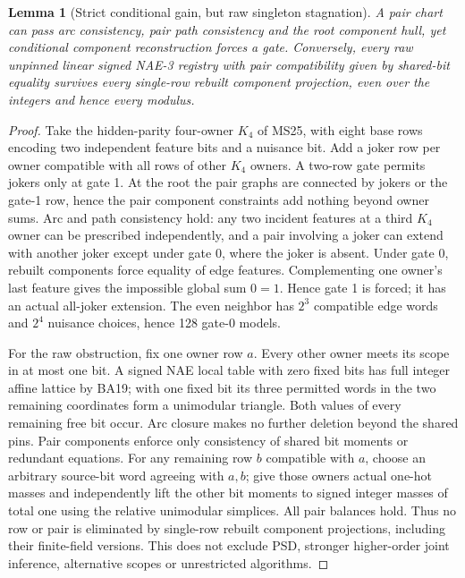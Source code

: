 \documentclass[11pt]{article}
\newtheorem{lemma}[theorem]{Lemma}
\begin{document}
\begin{lemma}[Strict conditional gain, but raw singleton stagnation]\label{lem:ms26-stall}
A pair chart can pass arc consistency, pair path consistency and the root component hull, yet conditional component reconstruction forces a gate. Conversely, every raw unpinned linear signed NAE-3 registry with pair compatibility given by shared-bit equality survives every single-row rebuilt component projection, even over the integers and hence every modulus.
\end{lemma}
\begin{proof}
Take the hidden-parity four-owner $K_4$ of MS25, with eight base rows encoding two independent feature bits and a nuisance bit. Add a joker row per owner compatible with all rows of other $K_4$ owners. A two-row gate permits jokers only at gate 1. At the root the pair graphs are connected by jokers or the gate-1 row, hence the pair component constraints add nothing beyond owner sums. Arc and path consistency hold: any two incident features at a third $K_4$ owner can be prescribed independently, and a pair involving a joker can extend with another joker except under gate 0, where the joker is absent. Under gate 0, rebuilt components force equality of edge features. Complementing one owner's last feature gives the impossible global sum $0=1$. Hence gate 1 is forced; it has an actual all-joker extension. The even neighbor has $2^3$ compatible edge words and $2^4$ nuisance choices, hence 128 gate-0 models.

For the raw obstruction, fix one owner row $a$. Every other owner meets its scope in at most one bit. A signed NAE local table with zero fixed bits has full integer affine lattice by BA19; with one fixed bit its three permitted words in the two remaining coordinates form a unimodular triangle. Both values of every remaining free bit occur. Arc closure makes no further deletion beyond the shared pins. Pair components enforce only consistency of shared bit moments or redundant equations. For any remaining row $b$ compatible with $a$, choose an arbitrary source-bit word agreeing with $a,b$; give those owners actual one-hot masses and independently lift the other bit moments to signed integer masses of total one using the relative unimodular simplices. All pair balances hold. Thus no row or pair is eliminated by single-row rebuilt component projections, including their finite-field versions. This does not exclude PSD, stronger higher-order joint inference, alternative scopes or unrestricted algorithms.
\end{proof}
\end{document}
